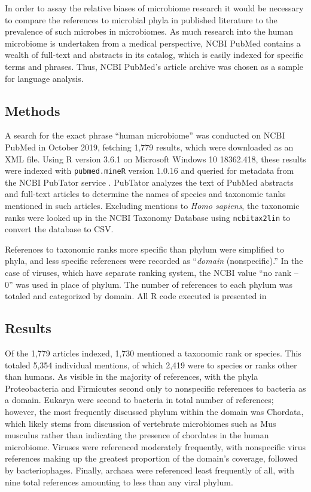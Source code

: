 \documentclass{../../../coursework}
\begin{document}
In order to assay the relative biases of microbiome research it would be
necessary to compare the references to microbial phyla in published
literature to the prevalence of such microbes in microbiomes. As much
research into the human microbiome is undertaken from a medical perspective,
NCBI PubMed contains a wealth of full-text and abstracts in its catalog,
which is easily indexed for specific terms and phrases. Thus, NCBI PubMed's
article archive was chosen as a sample for language analysis.

\subsection{Methods}

A search for the exact phrase ``human microbiome'' was conducted on NCBI
PubMed in October 2019, fetching 1,779 results, which were downloaded as an
XML file. Using R version 3.6.1 \parencite{RCol19} on Microsoft Windows 10
18362.418, these results were indexed with \texttt{pubmed.mineR} version
1.0.16 \parencite{Ran19} and queried for metadata from the NCBI PubTator
service \parencite{Wei19}. PubTator analyzes the text of PubMed abstracts and
full-text articles to determine the names of species and taxonomic tanks
mentioned in such articles. Excluding mentions to \textit{Homo sapiens}, the
taxonomic ranks were looked up in the NCBI Taxonomy Database
\parencite{Nat19} using \texttt{ncbitax2lin} \parencite{Xue19} to convert the
database to CSV.

References to taxonomic ranks more specific than phylum were simplified to
phyla, and less specific references were recorded as ``\textit{domain}
(nonspecific).'' In the case of viruses, which have separate ranking system,
the NCBI value ``no rank – 0'' was used in place of phylum. The number of
references to each phylum was totaled and categorized by domain. All R code
executed is presented in %

\subsection{Results}

Of the 1,779 articles indexed, 1,730 mentioned a taxonomic rank or species.
This totaled 5,354 individual mentions, of which 2,419 were to species or
ranks other than humans. As visible in %
the majority of references, with the phyla Proteobacteria and Firmicutes
second only to nonspecific references to bacteria as a domain. Eukarya were
second to bacteria in total number of references; however, the most
frequently discussed phylum within the domain was Chordata, which likely
stems from discussion of vertebrate microbiomes such as Mus musculus rather
than indicating the presence of chordates in the human microbiome. Viruses
were referenced moderately frequently, with nonspecific virus references
making up the greatest proportion of the domain's coverage, followed by
bacteriophages. Finally, archaea were referenced least frequently of all,
with nine total references amounting to less than any viral phylum.
\end{document}
